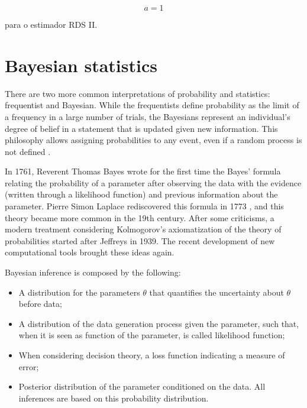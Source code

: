 \begin{equation}
    \label{eq:rdsI}
     a = 1
\end{equation}

 \cite{volz2008probability} para o estimador RDS II. 

\section{Bayesian statistics}

There are two more common interpretations of probability and statistics:
frequentist and Bayesian. While the frequentists define
probability as the limit of a frequency in a large number of trials, the
Bayesians represent an individual's degree of belief in a statement that is
updated given new information. This philosophy allows assigning probabilities
to any event, even if a random process is not defined \cite{statisticat2016laplacesdemon}. 

In 1761, Reverent Thomas Bayes wrote for the first time the Bayes' formula
relating the probability of a parameter after observing the data with the
evidence (written through a likelihood function) and previous information
about the parameter. Pierre Simon Laplace rediscovered this formula in 1773
\cite{Robert2007}, and this theory became more common in the 19th century.
After some criticisms, a modern treatment considering Kolmogorov's axiomatization of the theory of probabilities started after Jeffreys in 1939.
The recent development of new computational tools brought these ideas again.

Bayesian inference is composed by the following: 

\begin{itemize}
    \item A distribution for the parameters $\theta$ that quantifies the
    uncertainty about $\theta$ before data;
    \item A distribution of the data generation process given the parameter,
    such that, when it is seen as function of the parameter, is called
    likelihood function;
    \item When considering decision theory, a loss function indicating a
    measure of error;
    \item Posterior distribution of the parameter conditioned on the data. All
    inferences are based on this probability distribution.
\end{itemize} 